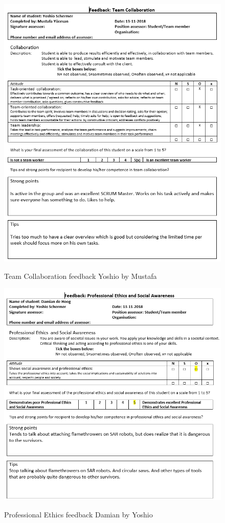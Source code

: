\documentclass[12pt]{article}
\begin{document}
	\begin{figure}[p!]
		\centering
		\includegraphics[width=\columnwidth]{CoopYoshio2.PNG}\\
		\caption{Team Collaboration feedback Yoshio by Mustafa}
	\end{figure}
	\begin{figure}[p!]
		\centering
		\includegraphics[width=\columnwidth]{ProfEthDamian3.PNG}\\
		\caption{Professional Ethics feedback Damian by Yoshio}
	\end{figure}
\end{document}
